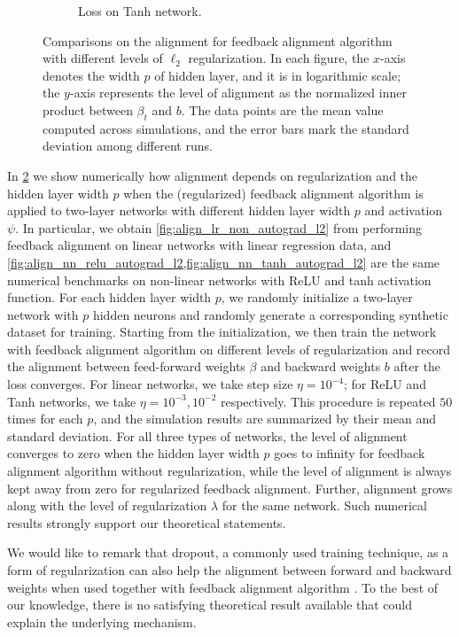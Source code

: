 \begin{figure}[h]
\begin{subfigure}[b]{.33\textwidth}
  \caption{Loss on Tanh network.}
  \label{fig:loss_nn_tanh_autograd_l2}
\end{subfigure}
\caption{Comparisons on the alignment for feedback alignment algorithm with different levels of $\ell_2$ regularization. In each figure, the $x$-axis denotes the width $p$ of hidden layer, and it is in logarithmic scale; the $y$-axis represents the level of alignment as the normalized inner product between $\beta_t$ and $b$. The data points are the mean value computed across simulations, and the error bars mark the standard deviation among different runs.}
\label{fig:synthetic-l2}
\end{figure}

In \cref{fig:synthetic-l2} we show numerically how alignment depends on regularization and the hidden layer width $p$ when the (regularized) feedback alignment algorithm is applied to two-layer networks with different hidden layer width $p$ and activation $\psi$. In particular, we obtain \cref{fig:align_lr_non_autograd_l2} from performing feedback alignment on linear networks with linear regression data, and \cref{fig:align_nn_relu_autograd_l2,fig:align_nn_tanh_autograd_l2} are the same numerical benchmarks on non-linear networks with ReLU and tanh activation function. For each hidden layer width $p$, we randomly initialize a two-layer network with $p$ hidden neurons and randomly generate a corresponding synthetic dataset for training. Starting from the initialization, we then train the network with feedback alignment algorithm on different levels of regularization and record the alignment between feed-forward weights $\beta$ and backward weights $b$ after the loss converges. For linear networks, we take step size $\eta = 10^{-4}$; for ReLU and Tanh networks, we take $\eta = 10^{-3},10^{-2}$ respectively. This procedure is repeated $50$ times for each $p$, and the simulation results are summarized by their mean and standard deviation. For all three types of networks, the level of alignment converges to zero when the hidden layer width $p$ goes to infinity for feedback alignment algorithm without regularization, while the level of alignment is always kept away from zero for regularized feedback alignment. Further, alignment grows along with the level of regularization $\lambda$ for the same network. Such numerical results strongly support our theoretical statements.

We would like to remark that dropout, a commonly used training technique, as a form of regularization can also help the alignment between forward and backward weights when used together with feedback alignment algorithm \citep{wager2013dropout}. To the best of our knowledge, there is no satisfying theoretical result available that could explain the underlying mechanism.


